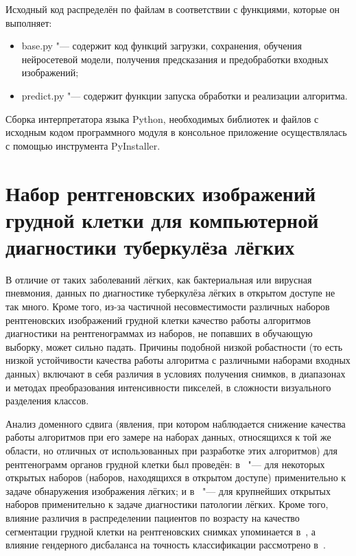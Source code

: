 Исходный код распределён по файлам в соответствии с функциями, которые он выполняет:

\begin{itemize}[beginpenalty=10000]
	\item base.py "--- содержит код функций загрузки, сохранения, обучения нейросетевой модели, получения предсказания и предобработки входных изображений;
	\item predict.py "--- содержит функции запуска обработки и реализации алгоритма.
\end{itemize}

Сборка интерпретатора языка Python, необходимых библиотек и файлов с исходным кодом программного модуля в консольное приложение осуществлялась с помощью инструмента PyInstaller.

\section{Набор рентгеновских изображений грудной клетки для компьютерной диагностики туберкулёза лёгких} \label{sec:sakha-tb}

В отличие от таких заболеваний лёгких, как бактериальная или вирусная пневмония, данных по диагностике туберкулёза лёгких в открытом доступе не так много. Кроме того, из-за частичной несовместимости различных наборов рентгеновских изображений грудной клетки качество работы алгоритмов диагностики на рентгенограммах из наборов, не попавших в обучающую выборку, может сильно падать. Причины подобной низкой робастности (то есть низкой устойчивости качества работы алгоритма с различными наборами входных данных) включают в себя различия в условиях получения снимков, в диапазонах и методах преобразования интенсивности пикселей, в сложности визуального разделения классов.

Анализ доменного сдвига (явления, при котором наблюдается снижение качества работы алгоритмов при его замере на наборах данных, относящихся к той же области, но отличных от использованных при разработке этих алгоритмов) для рентгенограмм органов грудной клетки был проведён: в~\cite{xue2023cross} "--- для некоторых открытых наборов (наборов, находящихся в открытом доступе) применительно к задаче обнаружения изображения лёгких; и в~\cite{pooch2020can} "--- для крупнейших открытых наборов применительно к задаче диагностики патологии лёгких. Кроме того, влияние различия в распределении пациентов по возрасту на качество сегментации грудной клетки на рентгеновских снимках упоминается в~\cite{gaggion2022improving}, а влияние гендерного дисбаланса на точность классификации рассмотрено в~\cite{larrazabal2020gender}.

